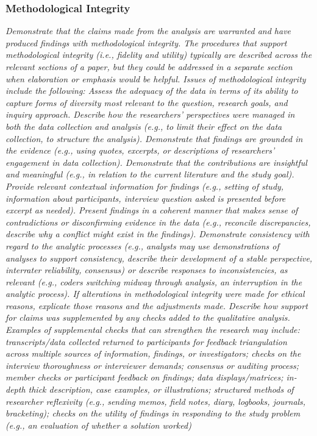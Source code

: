 \documentclass[acmsmall]{acmart}
\begin{document}
\subsubsection{Methodological Integrity}

{\em\small Demonstrate that the claims made from the analysis are warranted and have produced findings with methodological integrity. The procedures that support methodological integrity (i.e., fidelity and utility) typically are described across the relevant sections of a paper, but they could be addressed in a separate section when elaboration or emphasis would be helpful. Issues of methodological integrity include the following: Assess the adequacy of the data in terms of its ability to capture forms of diversity most relevant to the question, research goals, and inquiry approach. Describe how the researchers’ perspectives were managed in both the data collection and analysis (e.g., to limit their effect on the data collection, to structure the analysis). Demonstrate that findings are grounded in the evidence (e.g., using quotes, excerpts, or descriptions of researchers’ engagement in data collection). Demonstrate that the contributions are insightful and meaningful (e.g., in relation to the current literature and the study goal). Provide relevant contextual information for findings (e.g., setting of study, information about participants, interview question asked is presented before excerpt as needed). Present findings in a coherent manner that makes sense of contradictions or disconfirming evidence in the data (e.g., reconcile discrepancies, describe why a conflict might exist in the findings). Demonstrate consistency with regard to the analytic processes (e.g., analysts may use demonstrations of analyses to support consistency, describe their development of a stable perspective, interrater reliability, consensus) or describe responses to inconsistencies, as relevant (e.g., coders switching midway through analysis, an interruption in the analytic process). If alterations in methodological integrity were made for ethical reasons, explicate those reasons and the adjustments made. Describe how support for claims was supplemented by any checks added to the qualitative analysis. Examples of supplemental checks that can strengthen the research may include: transcripts/data collected returned to participants for feedback triangulation across multiple sources of information, findings, or investigators; checks on the interview thoroughness or interviewer demands; consensus or auditing process; member checks or participant feedback on findings; data displays/matrices; in-depth thick description, case examples, or illustrations; structured methods of researcher reflexivity (e.g., sending memos, field notes, diary, logbooks, journals, bracketing); checks on the utility of findings in responding to the study problem (e.g., an evaluation of whether a solution worked) }
\end{document}
